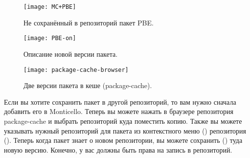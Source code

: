 \documentclass[a4paper,10pt,twoside]{book}
\begin{document}
\begin{figure}[tbp]
	\begin{center}
		\texttt{[image: MC+PBE]}
	\end{center}
	\caption{Не сохранённый в репозиторий пакет PBE.}
\end{figure}

\begin{figure}[tbp]
	\begin{center}
	\texttt{[image: PBE-on]}
	\end{center}
	\caption{Описание новой версии пакета.}
\end{figure}

\begin{figure}[tbp]
	\begin{center}
	\texttt{[image: package-cache-browser]}
	\end{center}
	\caption{Две версии пакета в кеше (package-cache).}
\end{figure}


Если вы хотите сохранить пакет в другой репозиторий, то вам нужно сначала добавить его в Monticello. Теперь вы можете нажать  в браузере репозитория package-cache и выбрать репозиторий куда поместить копию. Также вы можете указывать нужный репозиторий для пакета из контекстного меню () репозитория (). Теперь когда пакет знает о новом репозитории, вы можете сохранить () туда новую версию. Конечно, у вас должны быть права на запись в репозиторий.

\end{document}
